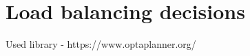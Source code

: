 \section{Load balancing decisions}\label{sec:load-balancing-decisions}

Used library - https://www.optaplanner.org/
